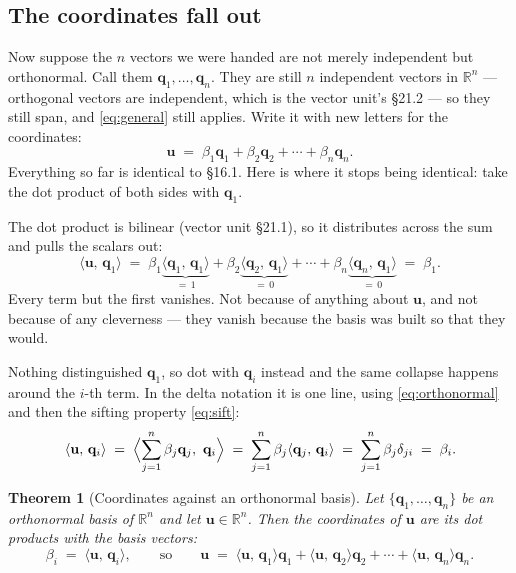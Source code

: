 \documentclass[11pt]{article}
\theoremstyle{plain}
\newtheorem{thm}{Theorem}[section]
\theoremstyle{definition}
\theoremstyle{remark}
\newcommand{\R}{\mathbb{R}}
\newcommand{\vc}[1]{\mathbf{#1}}
\newcommand{\ip}[2]{\langle #1,\, #2\rangle}
\begin{document}
\subsection{The coordinates fall out}
Now suppose the $n$ vectors we were handed are not merely independent but
orthonormal. Call them $\vc{q}_{1},\dots,\vc{q}_{n}$. They are still $n$
independent vectors in $\R^{n}$ --- orthogonal vectors are independent, which is
the vector unit's \S21.2 --- so they still span, and \eqref{eq:general} still
applies. Write it with new letters for the coordinates:
\begin{equation}\label{eq:onb}
  \vc{u} \;=\; \beta_{1}\vc{q}_{1} + \beta_{2}\vc{q}_{2}
           + \cdots + \beta_{n}\vc{q}_{n} .
\end{equation}
Everything so far is identical to \S16.1. Here is where it stops being
identical: take the dot product of both sides with $\vc{q}_{1}$.

The dot product is bilinear (vector unit \S21.1), so it distributes across the
sum and pulls the scalars out:
\[
  \ip{\vc{u}}{\vc{q}_{1}}
  \;=\; \beta_{1}\underbrace{\ip{\vc{q}_{1}}{\vc{q}_{1}}}_{=\,1}
      + \beta_{2}\underbrace{\ip{\vc{q}_{2}}{\vc{q}_{1}}}_{=\,0}
      + \cdots
      + \beta_{n}\underbrace{\ip{\vc{q}_{n}}{\vc{q}_{1}}}_{=\,0}
  \;=\; \beta_{1} .
\]
Every term but the first vanishes. Not because of anything about $\vc{u}$, and
not because of any cleverness --- they vanish because the basis was built so
that they would.

Nothing distinguished $\vc{q}_{1}$, so dot with $\vc{q}_{i}$ instead and the
same collapse happens around the $i$-th term. In the delta notation it is one
line, using \eqref{eq:orthonormal} and then the sifting property
\eqref{eq:sift}:
\[
  \ip{\vc{u}}{\vc{q}_{i}}
  \;=\; \Bigl\langle \sum_{j=1}^{n}\beta_{j}\vc{q}_{j},\ \vc{q}_{i}\Bigr\rangle
  \;=\; \sum_{j=1}^{n}\beta_{j}\ip{\vc{q}_{j}}{\vc{q}_{i}}
  \;=\; \sum_{j=1}^{n}\beta_{j}\delta_{ji}
  \;=\; \beta_{i} .
\]

\begin{thm}[Coordinates against an orthonormal basis]\label{thm:coords}
Let $\{\vc{q}_{1},\dots,\vc{q}_{n}\}$ be an orthonormal basis of $\R^{n}$ and
let $\vc{u}\in\R^{n}$. Then the coordinates of $\vc{u}$ are its dot products
with the basis vectors:
\[
  \beta_{i} \;=\; \ip{\vc{u}}{\vc{q}_{i}},
  \qquad\text{so}\qquad
  \vc{u} \;=\; \ip{\vc{u}}{\vc{q}_{1}}\vc{q}_{1}
             + \ip{\vc{u}}{\vc{q}_{2}}\vc{q}_{2}
             + \cdots
             + \ip{\vc{u}}{\vc{q}_{n}}\vc{q}_{n} .
\]
\end{thm}
\end{document}
